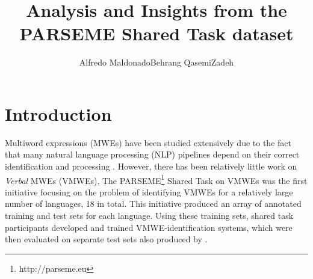 \documentclass[output=paper,modfonts,nonflat,draftmode]{langsci/langscibook}
\title{Analysis and Insights from the PARSEME Shared Task dataset}
\author{Alfredo Maldonado\affiliation{ADAPT Centre, Trinity College Dublin}\lastand  Behrang QasemiZadeh\affiliation{University of Düsseldorf}}
\begin{document}
\maketitle
\label{MALDONADO-CHAPTER}
\section{Introduction} 






%

Multiword expressions (MWEs) have been studied extensively due to the fact that many natural language processing (NLP) pipelines depend on their correct identification and processing \citep{Sag2002a}. However, there has been relatively little work on \emph{Verbal} MWEs (VMWEs). The PARSEME\footnote{http://parseme.eu} Shared Task on VMWEs \citep{MWEWorkshop} was the first initiative focusing on the problem of identifying VMWEs for a relatively large number of languages, 18 in total. This initiative produced an array of annotated training and test sets for each language. Using these training sets, shared task participants developed and trained VMWE-identification systems, which were then evaluated on separate test sets also produced by . 
\end{document}

